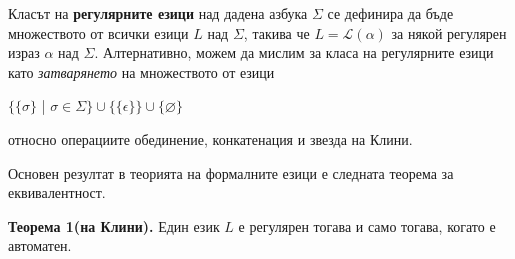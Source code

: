 \documentclass[openany]{book}
\begin{document}
            \vspace{15pt}
        
            \hspace{15pt} Класът на \textbf{регулярните езици} над дадена азбука $\Sigma$ се дефинира
            да бъде множеството от всички езици $L$ над $\Sigma$, такива че $L = \mathscr{L}(\alpha)$ 
            за някой регулярен израз $\alpha$ над $\Sigma$. Алтернативно, можем да мислим за класа
            на регулярните езици като \textit{затварянето} на множеството от езици
            \begin{center}
                $\{\{\sigma\}$ | $\sigma \in \Sigma\} \cup \{\{\epsilon\}\} \cup \{\varnothing\}$
            \end{center}
            относно операциите обединение, конкатенация и звезда на Клини. 
        
            \vspace{15pt}
        
            \hspace{15pt} Основен резултат в теорията на формалните езици е следната теорема за еквивалентност. 
        
            \vspace{15pt}
        
            \textbf{Теорема 1(на Клини).} Един език $L$ е регулярен тогава и само тогава, когато
            е автоматен.
            
            \vspace{15pt}
        
\end{document}
